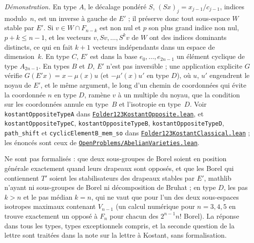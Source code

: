 {\small \emph{Démonstration.} En type $A$, le décalage pondéré $S$, $(Sx)_j = x_{j-1}/c_{j-1}$, indices modulo~$n$, est un inverse à gauche de $E'$ ; il préserve donc tout sous-espace $W$ stable par $E'$. Si $v \in W \cap F_{n-k}$ est non nul et $p$ son plus grand indice non nul, $p + k \leq n - 1$, et les vecteurs $v, Sv, \ldots, S^k v$ de $W$ ont des indices dominants distincts, ce qui en fait $k + 1$ vecteurs indépendants dans un espace de dimension~$k$. En type $C$, $E'$ est dans la base $e_0, \ldots, e_{2n-1}$ un élément cyclique de type $A_{2n-1}$. En types $B$ et $D$, $E'$ n'est pas inversible ; une application explicite $G$ vérifie $G(E'x) = x - \mu(x)u$ (et $- \mu'(x)u'$ en type $D$), où $u$, $u'$ engendrent le noyau de $E'$, et le même argument, le long d'un chemin de coordonnées qui évite la coordonnée $n$ en type $D$, ramène $v$ à un multiple du noyau, que la condition sur les coordonnées annule en type~$B$ et l'isotropie en type~$D$. Voir \texttt{kostantOppositeTypeA} dans \href{\leanblobmain/RepresentationTheory/Folder123KostantOpposite.lean}{\texttt{Folder123KostantOpposite.\allowbreak{}lean}}, et \texttt{kostantOppositeTypeC}, \texttt{kostantOppositeTypeB}, \texttt{kostantOppositeTypeD}, \texttt{path\_shift} et \texttt{cyclicElementB\_mem\_so} dans \href{\leanblobmain/RepresentationTheory/Folder123KostantClassical.lean}{\texttt{Folder123KostantClassical.\allowbreak{}lean}} ; les énoncés sont ceux de \href{https://github.com/Commutator-IO/GrothendieckArchivesProofs/blob/main/OpenProblems/AbelianVarieties.lean}{\texttt{OpenProblems/AbelianVarieties.\allowbreak{}lean}}.

Ne sont pas formalisés : que deux sous-groupes de Borel soient en position générale exactement quand leurs drapeaux sont opposés, et que les Borel qui contiennent $T'$ soient les stabilisateurs des drapeaux stables par $E'$, mathlib n'ayant ni sous-groupes de Borel ni décomposition de Bruhat ; en type $D$, les pas $k > n$ et le pas médian $k = n$, qui ne vaut que pour l'un des deux sous-espaces isotropes maximaux contenant $V_{n-1}$ (un calcul numérique pour $n = 3, 4, 5$ en trouve exactement un opposé à $F_n$ pour chacun des $2^{n-1} n!$ Borel). La réponse dans tous les types, types exceptionnels compris, et la seconde question de la lettre sont traitées dans la note sur la lettre à Kostant, sans formalisation.\par}


